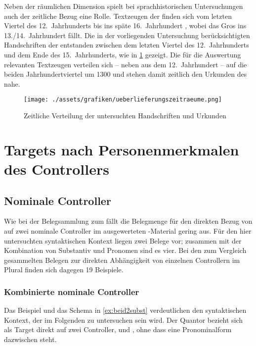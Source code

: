 Neben der räumlichen Dimension spielt bei sprachhistorischen Untersuchungen
auch der zeitliche Bezug eine Rolle. Textzeugen der \KC{} finden sich vom
letzten Viertel des 12.~Jahrhunderts \autocites{kc:A1} bis ins späte
16.~Jahrhundert \autocite{kc:T}, wobei das Gros ins 13./14.~Jahrhundert fällt.
Die in der vorliegenden Untersuchung berücksichtigten Handschriften der
\KC{} entstanden zwischen dem letzten Viertel des 12.~Jahrhunderts und dem
Ende des 15.~Jahrhunderts, wie in \cref{fig:zeitstrahl} gezeigt. Die für die
Auswertung relevanten Textzeugen verteilen sich -- neben \citet{kc:A1} aus dem
12.~Jahrhundert -- auf die beiden Jahrhundertviertel um 1300 und stehen damit
zeitlich den Urkunden des \CAO{} nahe.

\begin{figure}[p]
\centering
\texttt{[image: ./assets/grafiken/ueberlieferungszeitraeume.png]}
\caption{Zeitliche Verteilung der untersuchten Handschriften und Urkunden}
\label{fig:zeitstrahl}
\end{figure}

\section{Targets nach Personenmerkmalen des Controllers}
\label{sec:kctargpers}

\subsection{Nominale Controller}

Wie bei der Belegsammlung zum \CAO{} fällt die Belegmenge für den
direkten Bezug von  auf zwei nominale Controller im ausgewerteten
\KC{}-Material gering aus. Für den hier untersuchten syntaktischen Kontext
liegen zwei Belege vor; zusammen mit der Kombination von Substantiv und
Pronomen sind es vier. Bei den zum Vergleich gesammelten Belegen zur direkten
Abhängigkeit von einzelnen Controllern im Plural finden sich dagegen 19
Beispiele.

\subsubsection{Kombinierte nominale Controller}
\label{subsubsec:conomctrlpers}

Das Beispiel und das Schema in \cref{ex:beid2subst} verdeutlichen den
syntaktischen Kontext, der im Folgenden zu untersuchen sein wird. Der Quantor
 bezieht sich als Target direkt auf zwei Controller,
 und , ohne dass eine Pronominalform dazwischen
steht.

